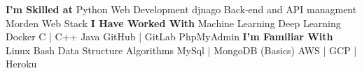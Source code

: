 
\begin{cvskills}
  \cvskill
   {\textbf{I'm Skilled at}}
    {Python \thinspace \bullet \thinspace \thinspace Web Development \thinspace \bullet \thinspace \thinspace djnago \thinspace \bullet \thinspace \thinspace Back-end and API managment \thinspace \bullet \thinspace \thinspace Morden Web Stack }
  \cvskill
     {\textbf{I Have Worked With}}
    {Machine Learning \thinspace \bullet \thinspace \thinspace  Deep Learning \thinspace \bullet \thinspace \thinspace Docker \thinspace \bullet \thinspace \thinspace C | C++ \thinspace \bullet \thinspace \thinspace Java \thinspace \bullet \thinspace \thinspace GitHub | GitLab \thinspace \bullet \thinspace \thinspace PhpMyAdmin}
  \cvskill
    {\textbf{I'm Familiar With}}
    {
    Linux Bash \thinspace \bullet \thinspace \thinspace Data Structure \thinspace \bullet \thinspace \thinspace Algorithms \thinspace \bullet \thinspace \thinspace MySql | MongoDB (Basics) \thinspace \bullet \thinspace \thinspace AWS | GCP | Heroku 
    }%

\end{cvskills}
